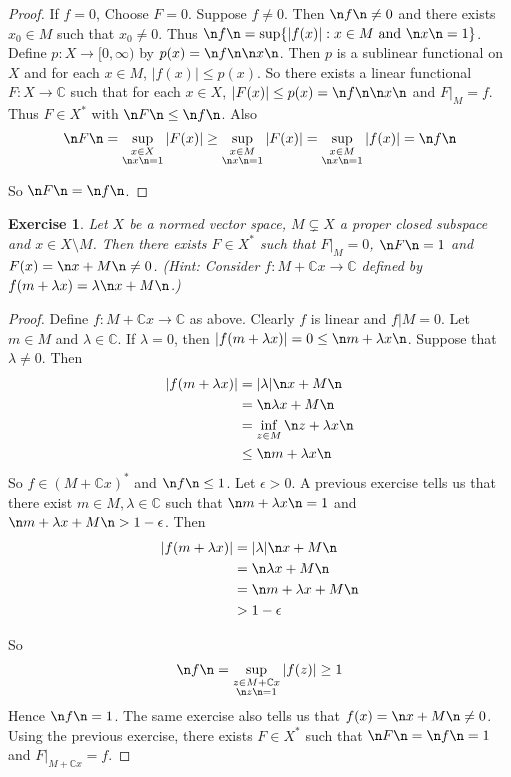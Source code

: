 \documentclass[12pt]{amsart}
\newtheorem{ex}[thm]{Exercise}
\newcommand{\lam}{\lambda}
\newcommand{\ep}{\epsilon}
\newcommand{\C}{\mathbb{C}}
\newcommand{\Rg}{[0,\infty)}
\begin{document}
\begin{proof}
	If $f =0$, Choose $F=0$. Suppose $f \neq 0$. Then $\n f \n \neq 0$ and there exists $x_0 \in M$ such that $x_0  \neq 0$. Thus $\n f \n = \sup \{ \vert f(x) \vert: x \in M \text{ and } \n x \n = 1\}$. Define $p:X \rightarrow \Rg$ by $ p(x) = \n f \n \n x \n $. Then $p$ is a sublinear functional on $X$ and for each $x \in M$, $\vert f(x) \vert \leq p(x)$. So there exists a linear functional $F:X \rightarrow \C$ such that for each $x \in X$, $\vert F(x) \vert \leq p(x) = \n f \n \n x \n$ and $F|_M = f$. Thus $F \in X^*$ with $\n F \n \leq \n f \n$. Also $$\n F \n = \sup_{\substack{ x \in X \\ \n x \n = 1}} \vert F(x) \vert \geq  \sup_{\substack{ x \in M \\ \n x \n = 1}} \vert F(x) \vert = \sup_{\substack{ x \in M \\ \n x \n = 1}} \vert f(x) \vert = \n f \n $$
	
	So $\n F \n = \n f \n$.
\end{proof}

\begin{ex}
	Let $X$ be a normed vector space, $M \subsetneq X$ a proper closed subspace and $x \in X \setminus M$. Then there exists $F \in X^*$ such that $F|_M = 0$, $\n F \n =1$ and $ F(x) = \n x+M \n \neq 0$. (Hint: Consider $f:M+\C x \rightarrow \C$ defined by $f(m+\lam x) = \lam \n x +M \n$.)
\end{ex}

\begin{proof}
	Define $f:M+\C x \rightarrow \C$ as above. Clearly $f$ is linear and $f|M = 0$. Let $m \in M$ and $\lam \in \C$. If $\lam = 0$, then $\vert f(m +\lam x) \vert = 0 \leq \n m+ \lam x \n$. Suppose that $\lam \neq 0$. Then 
	\begin{align*}
		\vert f(m+\lam x) \vert 
		& = \vert \lam \vert \n x+M \n\\
		& =  \n \lam x+M \n\\
		& = \inf_{z \in M} \n z+ \lam x \n \\
		& \leq  \n m+ \lam x  \n \\
	\end{align*} 
	So $f \in (M+\C x )^*$ and $\n f \n \leq 1$. Let $\ep >0$. A previous exercise tells us that there exist $m \in M, \lam \in \C$ such that $\n m+ \lam x \n = 1$ and $\n m+ \lam x +M \n > 1- \ep$. Then 
	\begin{align*}
		\vert f(m + \lam x) \vert
		&= \vert \lam \vert \n x+M\n\\
		&=\n \lam x +M \n\\
		&= \n m + \lam x +M \n\\
		&> 1-\ep
	\end{align*}
	
	So $$ \n f \n = \sup_{\substack{z \in M + \C x \\ \n z \n =1}} \vert f(z) \vert \geq 1$$ Hence $\n f \n =1$. 
	The same exercise also tells us that $f(x) = \n x+M\n \neq 0$. Using the previous exercise, there exists $F \in X^*$ such that $\n F \n = \n f \n = 1$ and $F|_{M+\C x} = f$.
\end{proof}
\end{document}
